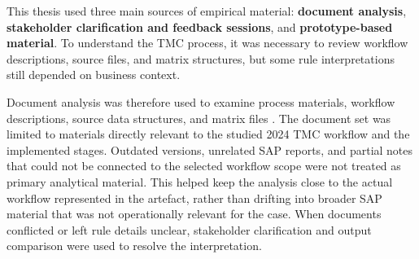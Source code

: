 


This thesis used three main sources of empirical material: \textbf{document analysis}, \textbf{stakeholder clarification and feedback sessions}, and \textbf{prototype-based material}. To understand the TMC process, it was necessary to review workflow descriptions, source files, and matrix structures, but some rule interpretations still depended on business context.

Document analysis was therefore used to examine process materials, workflow descriptions, source data structures, and matrix files \cite{bowen2009document}. The document set was limited to materials directly relevant to the studied 2024 TMC workflow and the implemented stages. Outdated versions, unrelated SAP reports, and partial notes that could not be connected to the selected workflow scope were not treated as primary analytical material. This helped keep the analysis close to the actual workflow represented in the artefact, rather than drifting into broader SAP material that was not operationally relevant for the case. When documents conflicted or left rule details unclear, stakeholder clarification and output comparison were used to resolve the interpretation.

